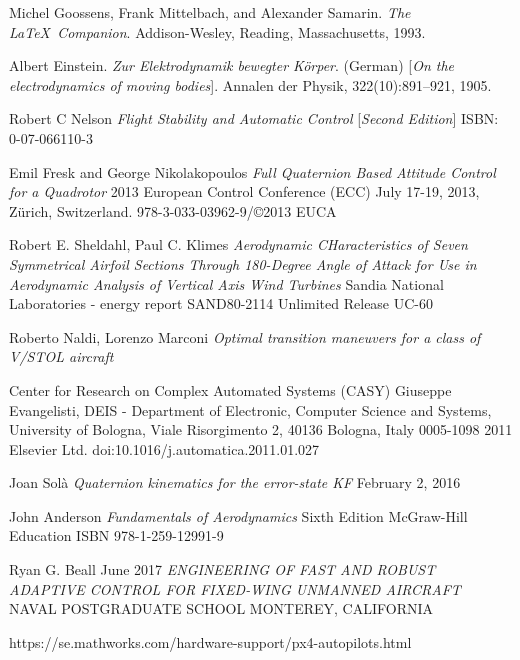 \documentclass{article}
\begin{document}
\begin{thebibliography}{9}
Michel Goossens, Frank Mittelbach, and Alexander Samarin. 
\textit{The \LaTeX\ Companion}. 
Addison-Wesley, Reading, Massachusetts, 1993.

Albert Einstein. 
\textit{Zur Elektrodynamik bewegter K{\"o}rper}. (German) 
[\textit{On the electrodynamics of moving bodies}]. 
Annalen der Physik, 322(10):891–921, 1905.

Robert C Nelson
\textit{Flight Stability and Automatic Control}
[\textit{Second Edition}]
ISBN: 0-07-066110-3

Emil Fresk and George Nikolakopoulos
\textit{Full Quaternion Based Attitude Control for a Quadrotor}
2013 European Control Conference (ECC)
July 17-19, 2013, Zürich, Switzerland.
978-3-033-03962-9/©2013 EUCA

Robert E. Sheldahl, Paul C. Klimes
\textit{Aerodynamic CHaracteristics of Seven Symmetrical Airfoil Sections Through 180-Degree Angle of Attack for Use in Aerodynamic Analysis of Vertical Axis Wind Turbines}
Sandia National Laboratories - energy report
SAND80-2114 Unlimited Release UC-60

Roberto Naldi, Lorenzo Marconi
\textit{Optimal transition maneuvers for a class of V/STOL aircraft}

Center for Research on Complex Automated Systems (CASY) Giuseppe Evangelisti, DEIS - Department of Electronic, Computer Science and Systems, University of Bologna, Viale
Risorgimento 2, 40136 Bologna, Italy
0005-1098 
2011 Elsevier Ltd.
doi:10.1016/j.automatica.2011.01.027

Joan Sol\`{a}
\textit{Quaternion kinematics for the error-state KF}
February 2, 2016

John Anderson
\textit{Fundamentals of Aerodynamics}
Sixth Edition
McGraw-Hill Education
ISBN 978-1-259-12991-9

Ryan G. Beall
June 2017
\textit{ENGINEERING OF FAST AND ROBUST ADAPTIVE
CONTROL FOR FIXED-WING UNMANNED AIRCRAFT}
NAVAL POSTGRADUATE SCHOOL MONTEREY, CALIFORNIA

https://se.mathworks.com/hardware-support/px4-autopilots.html


\end{thebibliography}
\end{document}
